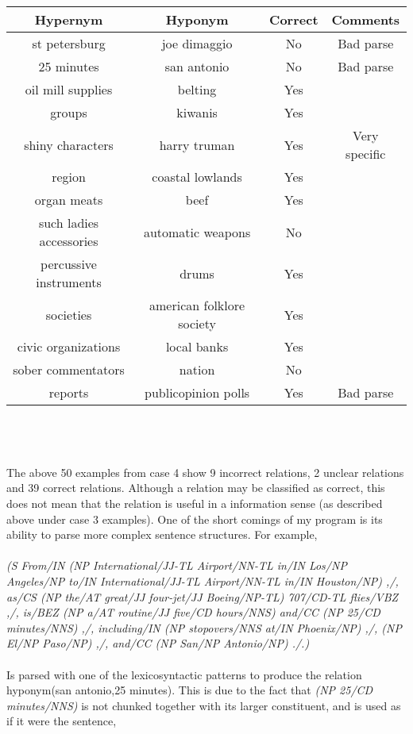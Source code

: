 \documentclass[11pt]{article}
\begin{document}
\begin{tabular}{c c c c}
Hypernym & Hyponym & Correct & Comments \\ \hline
st petersburg & joe dimaggio & No & Bad parse\\
25 minutes & san antonio & No & Bad parse\\
oil mill supplies & belting & Yes\\
groups & kiwanis & Yes \\
shiny characters & harry truman & Yes & Very specific\\
region & coastal lowlands & Yes\\
organ meats & beef  & Yes\\
such ladies accessories & automatic weapons & No\\
percussive instruments & drums & Yes \\
societies & american folklore society & Yes \\
civic organizations & local banks & Yes\\
sober commentators & nation & No\\
reports & publicopinion polls & Yes & Bad parse \\
\end{tabular} \\ \\ \\
The above 50 examples from case 4 show 9 incorrect relations, 2 unclear relations and 39 correct relations. Although a relation may be classified as correct, this does not mean that the relation is useful in a information sense (as described above under case 3 examples). One of the short comings of my program is its ability to parse more complex sentence structures. For example, \\ \\ \small
\textit{(S  From/IN  (NP    International/JJ-TL    Airport/NN-TL    in/IN    Los/NP    Angeles/NP    to/IN    International/JJ-TL    Airport/NN-TL    in/IN    Houston/NP)  ,/,  as/CS  (NP the/AT great/JJ four-jet/JJ Boeing/NP-TL)  707/CD-TL  flies/VBZ  ,/,  is/BEZ  (NP a/AT routine/JJ five/CD hours/NNS)  and/CC  (NP 25/CD minutes/NNS)  ,/,  including/IN  (NP stopovers/NNS at/IN Phoenix/NP)  ,/,  (NP El/NP Paso/NP)  ,/,  and/CC  (NP San/NP Antonio/NP)  ./.) } \\ \\ \normalsize
Is parsed with one of the lexicosyntactic patterns to produce the relation hyponym(san antonio,25 minutes). This is due to the fact that \textit{(NP 25/CD minutes/NNS)} is not chunked together with its larger constituent, and is used as if it were the sentence, \\ \\ \small
\end{document}
